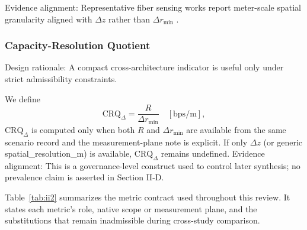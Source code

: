 \documentclass[lettersize,journal]{IEEEtran}
\begin{document}
Evidence alignment: Representative fiber sensing works report meter-scale spatial granularity aligned with \(\Delta z\) rather than \(\Delta r_{\min}\) \cite{O_ISAC_006,O_ISAC_013}.

\subsubsection{Capacity-Resolution Quotient}
Design rationale: A compact cross-architecture indicator is useful only under strict admissibility constraints.

We define
\begin{equation}
\mathrm{CRQ}_{\Delta} = \frac{R}{\Delta r_{\min}} \quad [\mathrm{bps/m}],
\end{equation}
\(\mathrm{CRQ}_{\Delta}\) is computed only when both \(R\) and \(\Delta r_{\min}\) are available from the same scenario record and the measurement-plane note is explicit. If only \(\Delta z\) (or generic spatial\_resolution\_m) is available, \(\mathrm{CRQ}_{\Delta}\) remains undefined.
Evidence alignment: This is a governance-level construct used to control later synthesis; no prevalence claim is asserted in Section II-D.

Table~\ref{tab:ii2} summarizes the metric contract used throughout this review. It states each metric's role, native scope or measurement plane, and the substitutions that remain inadmissible during cross-study comparison.
\end{document}
